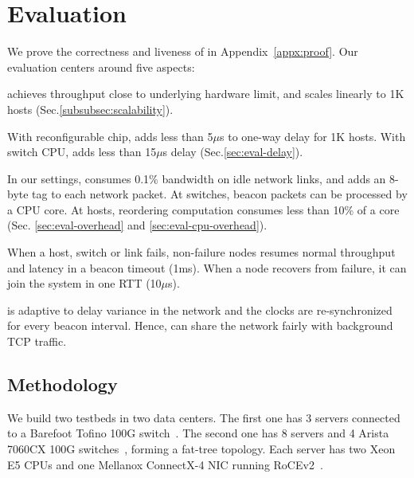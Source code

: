 \section{Evaluation}
\label{sec:evaluation}

We prove the correctness and liveness of \sys in Appendix~\ref{appx:proof}. Our evaluation centers around five aspects:

\sys achieves throughput close to underlying hardware limit, and scales linearly to 1K hosts (Sec.\ref{subsubsec:scalability}).

With reconfigurable chip, \sys adds less than 5$\mu$s to one-way delay for 1K hosts. With switch CPU, \sys adds less than 15$\mu$s delay (Sec.\ref{sec:eval-delay}).

In our settings, \sys consumes 0.1\% bandwidth on idle network links, and adds an 8-byte tag to each network packet. At switches, beacon packets can be processed by a CPU core. At hosts, reordering computation consumes less than 10\% of a core (Sec. \ref{sec:eval-overhead} and \ref{sec:eval-cpu-overhead}).

When a host, switch or link fails, non-failure nodes resumes normal throughput and latency in a beacon timeout (1ms). When a node recovers from failure, it can join the system in one RTT (10$\mu$s).

\sys is adaptive to delay variance in the network and the clocks are re-synchronized for every beacon interval. Hence, \sys can share the network fairly with background TCP traffic.

\subsection{Methodology}
\label{sec:testbed}

We build two testbeds in two data centers.
The first one has 3 servers connected to a Barefoot Tofino 100G switch~\cite{tofino}.
The second one has 8 servers and 4 Arista 7060CX 100G switches~\cite{arista}, forming a fat-tree topology.
Each server has two Xeon E5 CPUs and one Mellanox ConnectX-4 NIC running RoCEv2~\cite{infinibandrocev2}.


